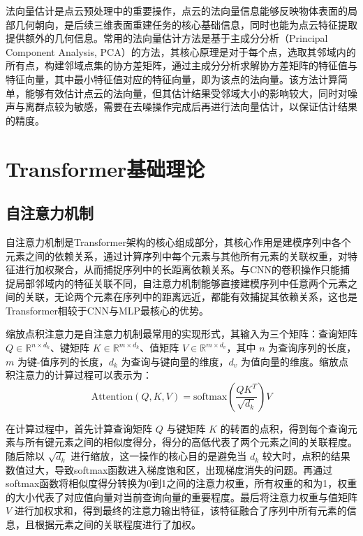法向量估计是点云预处理中的重要操作，点云的法向量信息能够反映物体表面的局部几何朝向，是后续三维表面重建任务的核心基础信息，同时也能为点云特征提取提供额外的几何信息。常用的法向量估计方法是基于主成分分析（Principal Component Analysis, PCA）的方法，其核心原理是对于每个点，选取其邻域内的所有点，构建邻域点集的协方差矩阵，通过主成分分析求解协方差矩阵的特征值与特征向量，其中最小特征值对应的特征向量，即为该点的法向量。该方法计算简单，能够有效估计点云的法向量，但其估计结果受邻域大小的影响较大，同时对噪声与离群点较为敏感，需要在去噪操作完成后再进行法向量估计，以保证估计结果的精度。

\section{Transformer基础理论}

\subsection{自注意力机制}
自注意力机制是Transformer架构的核心组成部分，其核心作用是建模序列中各个元素之间的依赖关系，通过计算序列中每个元素与其他所有元素的关联权重，对特征进行加权聚合，从而捕捉序列中的长距离依赖关系。与CNN的卷积操作只能捕捉局部邻域内的特征关联不同，自注意力机制能够直接建模序列中任意两个元素之间的关联，无论两个元素在序列中的距离远近，都能有效捕捉其依赖关系，这也是Transformer相较于CNN与MLP最核心的优势。

缩放点积注意力是自注意力机制最常用的实现形式，其输入为三个矩阵：查询矩阵 $Q \in \mathbb{R}^{n \times d_k}$、键矩阵 $K \in \mathbb{R}^{m \times d_k}$、值矩阵 $V \in \mathbb{R}^{m \times d_v}$，其中 $n$ 为查询序列的长度，$m$ 为键-值序列的长度，$d_k$ 为查询与键向量的维度，$d_v$ 为值向量的维度。缩放点积注意力的计算过程可以表示为：
\begin{equation}
\text{Attention}(Q, K, V) = \text{softmax}\left( \frac{QK^T}{\sqrt{d_k}} \right) V
\end{equation}

在计算过程中，首先计算查询矩阵 $Q$ 与键矩阵 $K$ 的转置的点积，得到每个查询元素与所有键元素之间的相似度得分，得分的高低代表了两个元素之间的关联程度。随后除以 $\sqrt{d_k}$ 进行缩放，这一操作的核心目的是避免当 $d_k$ 较大时，点积的结果数值过大，导致softmax函数进入梯度饱和区，出现梯度消失的问题。再通过softmax函数将相似度得分转换为0到1之间的注意力权重，所有权重的和为1，权重的大小代表了对应值向量对当前查询向量的重要程度。最后将注意力权重与值矩阵 $V$ 进行加权求和，得到最终的注意力输出特征，该特征融合了序列中所有元素的信息，且根据元素之间的关联程度进行了加权。

